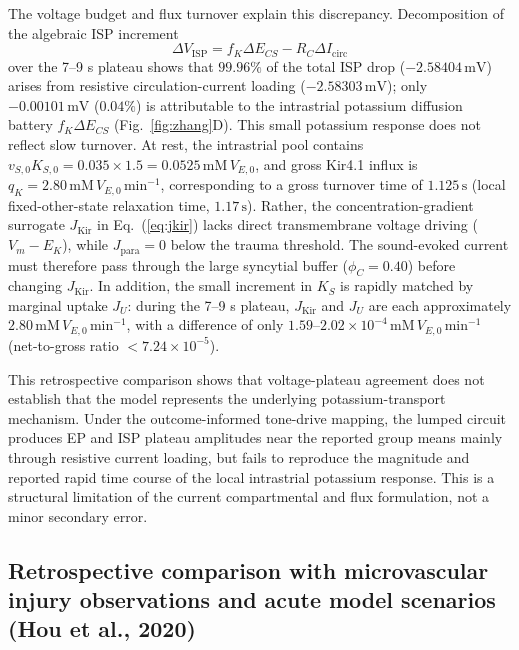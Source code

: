 \documentclass[final,5p,times]{elsarticle}
\begin{document}
The voltage budget and flux turnover explain this discrepancy. Decomposition of the algebraic ISP increment
  \begin{equation}
    \Delta V_{\mathrm{ISP}} = f_K \Delta E_{CS} - R_C \Delta I_{\mathrm{circ}}
    \label{eq:isp-budget}
  \end{equation}
over the 7--9 s plateau shows that \(99.96\%\) of the total ISP drop (\(-2.58404\,\mathrm{mV}\)) arises from resistive circulation-current loading (\(-2.58303\,\mathrm{mV}\)); only \(-0.00101\,\mathrm{mV}\) (\(0.04\%\)) is attributable to the intrastrial potassium diffusion battery \(f_K\Delta E_{CS}\) (Fig.~\ref{fig:zhang}D). This small potassium response does not reflect slow turnover. At rest, the intrastrial pool contains \(v_{S,0}K_{S,0}=0.035\times1.5=0.0525\,\mathrm{mM}\,V_{E,0}\), and gross Kir4.1 influx is \(q_K=2.80\,\mathrm{mM}\,V_{E,0}\,\mathrm{min}^{-1}\), corresponding to a gross turnover time of \(1.125\,\mathrm{s}\) (local fixed-other-state relaxation time, \(1.17\,\mathrm{s}\)). Rather, the concentration-gradient surrogate \(J_{\mathrm{Kir}}\) in Eq.~(\ref{eq:jkir}) lacks direct transmembrane voltage driving (\(V_m-E_K\)), while \(J_{\mathrm{para}}=0\) below the trauma threshold. The sound-evoked current must therefore pass through the large syncytial buffer (\(\phi_C=0.40\)) before changing \(J_{\mathrm{Kir}}\). In addition, the small increment in \(K_S\) is rapidly matched by marginal uptake \(J_U\): during the 7--9 s plateau, \(J_{\mathrm{Kir}}\) and \(J_U\) are each approximately \(2.80\,\mathrm{mM}\,V_{E,0}\,\mathrm{min}^{-1}\), with a difference of only \(1.59\)--\(2.02\times10^{-4}\,\mathrm{mM}\,V_{E,0}\,\mathrm{min}^{-1}\) (net-to-gross ratio \(<7.24\times10^{-5}\)).

This retrospective comparison shows that voltage-plateau agreement does not establish that the model represents the underlying potassium-transport mechanism. Under the outcome-informed tone-drive mapping, the lumped circuit produces EP and ISP plateau amplitudes near the reported group means mainly through resistive current loading, but fails to reproduce the magnitude and reported rapid time course of the local intrastrial potassium response. This is a structural limitation of the current compartmental and flux formulation, not a minor secondary error.

\subsection{Retrospective comparison with microvascular injury observations and acute model scenarios (Hou et al., 2020)}\label{sec:benchmarks-hou}
\end{document}
